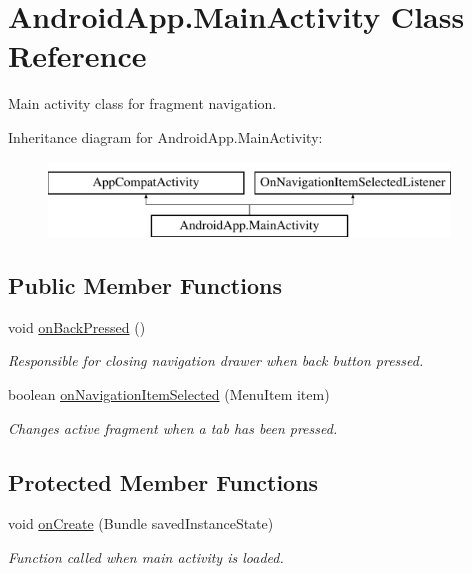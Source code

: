 \hypertarget{class_android_app_1_1_main_activity}{}\section{Android\+App.\+Main\+Activity Class Reference}
\label{class_android_app_1_1_main_activity}


Main activity class for fragment navigation.  


Inheritance diagram for Android\+App.\+Main\+Activity\+:\begin{figure}[H]
\begin{center}
\leavevmode
\includegraphics[height=2.000000cm]{class_android_app_1_1_main_activity}
\end{center}
\end{figure}
\subsection*{Public Member Functions}
\begin{DoxyCompactItemize}
\item 
\mbox{\label{class_android_app_1_1_main_activity_afe0a73fb9e8d588b51f2cc8222da80e8}} 
void \hyperlink{class_android_app_1_1_main_activity_afe0a73fb9e8d588b51f2cc8222da80e8}{on\+Back\+Pressed} ()
\begin{DoxyCompactList}\small\item\em Responsible for closing navigation drawer when back button pressed. \end{DoxyCompactList}\item 
boolean \hyperlink{class_android_app_1_1_main_activity_a260151867f535b62a2a926c270a2dbb8}{on\+Navigation\+Item\+Selected} (Menu\+Item item)
\begin{DoxyCompactList}\small\item\em Changes active fragment when a tab has been pressed. \end{DoxyCompactList}\end{DoxyCompactItemize}
\subsection*{Protected Member Functions}
\begin{DoxyCompactItemize}
\item 
void \hyperlink{class_android_app_1_1_main_activity_a2b1390dea8035d3802067ceb6ba5ebbd}{on\+Create} (Bundle saved\+Instance\+State)
\begin{DoxyCompactList}\small\item\em Function called when main activity is loaded. \end{DoxyCompactList}\end{DoxyCompactItemize}
